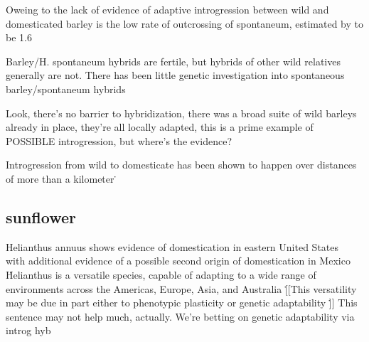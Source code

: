\documentclass[11pt]{article}
\begin{document}
Oweing to the lack of evidence of adaptive introgression between wild and domesticated barley is the low rate of outcrossing of spontaneum, estimated by \cite{brown1978outcrossing} to be 1.6%

Barley/H. spontaneum hybrids are fertile, but hybrids of other wild relatives generally are not.
There has been little genetic investigation into spontaneous barley/spontaneum hybrids \cite{ellstrand2003dangerous}

Look, there's no barrier to hybridization, there was a broad suite of wild barleys already in place, they're all locally adapted, this is a prime example of POSSIBLE introgression, but where's the evidence?

Introgression from wild to domesticate has been shown to happen over distances of more than a kilometer \cite{hillman2001new}\.

\subsection*{sunflower}

Helianthus annuus shows evidence of domestication in eastern United States \cite{harter2004origin, wills2006chloroplast}\, with additional evidence of a possible second origin of domestication in Mexico \cite{lentz2008sunflower}\.
Helianthus is a versatile species, capable of adapting to a wide range of environments across the Americas, Europe, Asia, and Australia \cite{kane2008genetics}\.
[[This versatility may be due in part either to phenotypic plasticity or genetic adaptability \cite{maron2004rapid}\.]] This sentence may not help much, actually.  We're betting on genetic adaptability via introg hyb
\end{document}
